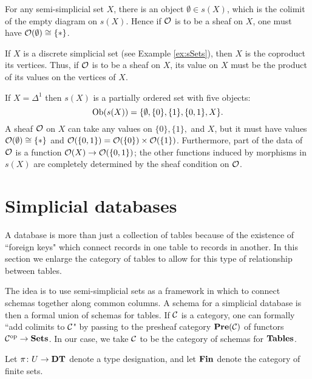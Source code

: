 \documentclass{amsart}
\def\DT{{\bf DT}}
\def\Tables{{\bf Tables}}
\def\Fin{{\bf Fin}}
\begin{document}
\begin{example}

For any semi-simplicial set $X$, there is an object $\emptyset\in s(X)$, which is the colimit of the empty diagram on $s(X)$.  Hence if $\mathcal{O}$ is to be a sheaf on $X$, one must have $\mathcal{O}(\emptyset)\cong\{*\}$.

If $X$ is a discrete simplicial set (see Example \ref{ex:sSets}), then $X$ is the coproduct its vertices.  Thus, if $\mathcal{O}$ is to be a sheaf on $X$, its value on $X$ must be the product of its values on the vertices of $X$.  

If $X=\Delta^1$ then $s(X)$ is a partially ordered set with five objects: $$\textnormal{Ob}(s(X))=\{\emptyset,\{0\},\{1\},\{0,1\},X\}.$$  A sheaf $\mathcal{O}$ on $X$ can take any values on $\{0\}, \{1\},$ and $X$, but it must have values $\mathcal{O}(\emptyset)\cong\{*\}$ and $\mathcal{O}(\{0,1\})=\mathcal{O}(\{0\})\times\mathcal{O}(\{1\})$.  Furthermore, part of the data of $\mathcal{O}$ is a function $\mathcal{O}(X)\rightarrow\mathcal{O}(\{0,1\})$; the other functions induced by morphisms in $s(X)$ are completely determined by the sheaf condition on $\mathcal{O}$.

\end{example}

\section{Simplicial databases}

A database is more than just a collection of tables because of the existence of ``foreign keys" which connect records in one table to records in another.  In this section we enlarge the category of tables to allow for this type of relationship between tables.

The idea is to use semi-simplicial sets as a framework in which to connect schemas together along common columns.  A schema for a simplicial database is then a formal union of schemas for tables.  If $\mathcal{C}$ is a category, one can formally ``add colimits to $\mathcal{C}$" by passing to the presheaf category ${\bf Pre}(\mathcal{C})$ of functors $\mathcal{C}^\textnormal{op}\rightarrow{\bf Sets}$.  In our case, we take $\mathcal{C}$ to be the category of schemas for $\Tables$.  

\begin{lemma}

Let $\pi\taking U\to\DT$ denote a type designation, and let $\Fin$ denote the category of finite sets.


\end{lemma}
\end{document}
